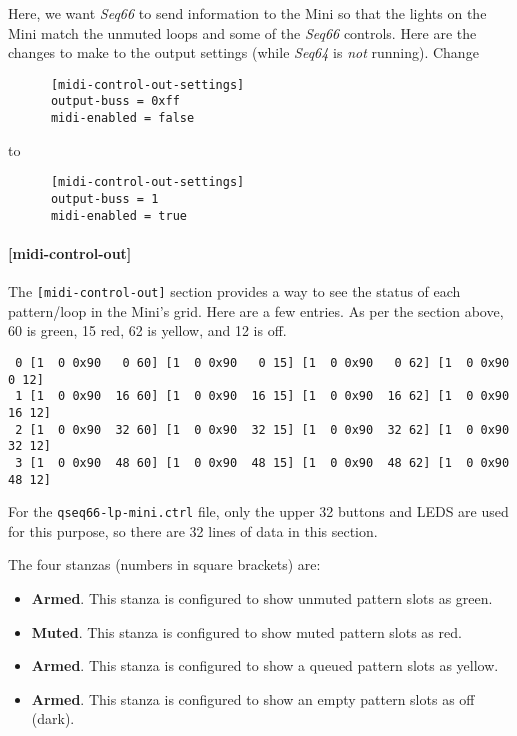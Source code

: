    Here, we want \textsl{Seq66} to send information to the Mini
   so that the lights on the Mini match the unmuted loops and 
   some of the \textsl{Seq66} controls.  Here are the changes to make to the
   output settings (while \textsl{Seq64} is \textsl{not} running).
   Change

   \begin{verbatim}
      [midi-control-out-settings]
      output-buss = 0xff
      midi-enabled = false
   \end{verbatim}

   to

   \begin{verbatim}
      [midi-control-out-settings]
      output-buss = 1
      midi-enabled = true
   \end{verbatim}

\paragraph{[midi-control-out]}
\label{paragraph:patterns_midi_control_out}

   The \texttt{[midi-control-out]} section provides a way to see the status of
   each pattern/loop in the Mini's grid.  Here are a few entries. As per the
   section above, 60 is green, 15 red, 62 is yellow, and 12 is off.

   \begin{verbatim}
 0 [1  0 0x90   0 60] [1  0 0x90   0 15] [1  0 0x90   0 62] [1  0 0x90   0 12]
 1 [1  0 0x90  16 60] [1  0 0x90  16 15] [1  0 0x90  16 62] [1  0 0x90  16 12]
 2 [1  0 0x90  32 60] [1  0 0x90  32 15] [1  0 0x90  32 62] [1  0 0x90  32 12]
 3 [1  0 0x90  48 60] [1  0 0x90  48 15] [1  0 0x90  48 62] [1  0 0x90  48 12]
   \end{verbatim}

   For the \texttt{qseq66-lp-mini.ctrl} file, only the upper 32 buttons and
   LEDS are used for this purpose, so there are 32 lines of data in this
   section.

   The four stanzas (numbers in square brackets) are:

   \begin{itemize}
      \item \textbf{Armed}.  This stanza is configured to show unmuted pattern
         slots as green.
      \item \textbf{Muted}.  This stanza is configured to show muted pattern
         slots as red.
      \item \textbf{Armed}.  This stanza is configured to show a queued pattern
         slots as yellow.
      \item \textbf{Armed}.  This stanza is configured to show an empty pattern
         slots as off (dark).
   \end{itemize}


